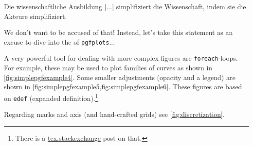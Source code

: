 \epigraph{Die wissenschaftliche Ausbildung [...] simplifiziert die \frqq Wissenschaft\flqq, indem sie die Akteure simplifiziert.}{}

We don’t want to be accused of that! Instead, let’s take this statement as an excuse to dive into the  of \verb|pgfplots|... 


A very powerful tool for dealing with more complex figures are \verb|foreach|-loops. For example, these may be used to plot families of curves as shown in \cref{fig:simplepgfexample4}. Some smaller adjustments (opacity and a legend) are shown in \cref{fig:simplepgfexample5,fig:simplepgfexample6}. These figures are based on \verb|edef| (expanded definition).\footnote{There is a \href{https://tex.stackexchange.com/questions/17638/pgfplots-foreach-equivalent-to-tikzs-with-multiple-variables-separated-by-a-sla}{\url{tex.stackexchange}} post on that.}

\begin{figure*}[h]
	\centering
	
	\caption{A family of modulated Gaussian curves.}
	\label{fig:simplepgfexample4}
\end{figure*}

\begin{figure*}[h]
	\centering
	
	\caption{Now using opacity ...}
	\label{fig:simplepgfexample5}
\end{figure*}

\begin{figure*}[h]
	\centering
	
	\caption{... and a legend.}
	\label{fig:simplepgfexample6}
\end{figure*}



Regarding marks and axis (and hand-crafted grids) see \cref{fig:discretization}.

\begin{figure*}
	\centering
	
	\caption{A visual overview about all pairings of discretization in time (sampling) and value (quantization, by slight abuse of floor-notation).}\label{fig:discretization}
\end{figure*}


